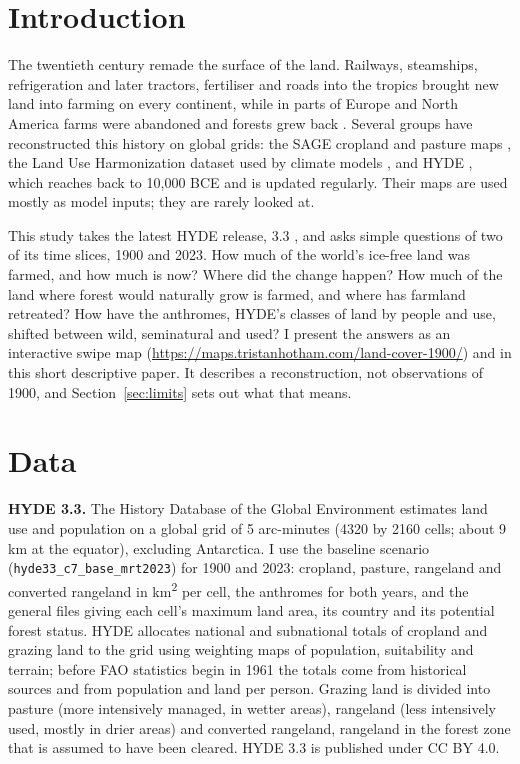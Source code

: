 \documentclass[11pt,a4paper]{article}
\begin{document}
\section{Introduction}
The twentieth century remade the surface of the land. Railways, steamships, refrigeration and later tractors, fertiliser and roads into the tropics brought new land into farming on every continent, while in parts of Europe and North America farms were abandoned and forests grew back \citep{williams,ramankutty}. Several groups have reconstructed this history on global grids: the SAGE cropland and pasture maps \citep{ramankutty}, the Land Use Harmonization dataset used by climate models \citep{luh2}, and HYDE \citep{hyde32}, which reaches back to 10,000 BCE and is updated regularly. Their maps are used mostly as model inputs; they are rarely looked at.

This study takes the latest HYDE release, 3.3 \citep{hyde33}, and asks simple questions of two of its time slices, 1900 and 2023. How much of the world's ice-free land was farmed, and how much is now? Where did the change happen? How much of the land where forest would naturally grow is farmed, and where has farmland retreated? How have the anthromes, HYDE's classes of land by people and use, shifted between wild, seminatural and used? I present the answers as an interactive swipe map (\url{https://maps.tristanhotham.com/land-cover-1900/}) and in this short descriptive paper. It describes a reconstruction, not observations of 1900, and Section~\ref{sec:limits} sets out what that means.

\section{Data}
\textbf{HYDE 3.3.} The History Database of the Global Environment \citep{hyde33,hyde32} estimates land use and population on a global grid of 5 arc-minutes (4320 by 2160 cells; about 9 km at the equator), excluding Antarctica. I use the baseline scenario (\texttt{hyde33\_c7\_base\_mrt2023}) for 1900 and 2023: cropland, pasture, rangeland and converted rangeland in km\textsuperscript{2} per cell, the anthromes for both years, and the general files giving each cell's maximum land area, its country and its potential forest status. HYDE allocates national and subnational totals of cropland and grazing land to the grid using weighting maps of population, suitability and terrain; before FAO statistics begin in 1961 the totals come from historical sources and from population and land per person. Grazing land is divided into pasture (more intensively managed, in wetter areas), rangeland (less intensively used, mostly in drier areas) and converted rangeland, rangeland in the forest zone that is assumed to have been cleared. HYDE 3.3 is published under CC BY 4.0.
\end{document}
